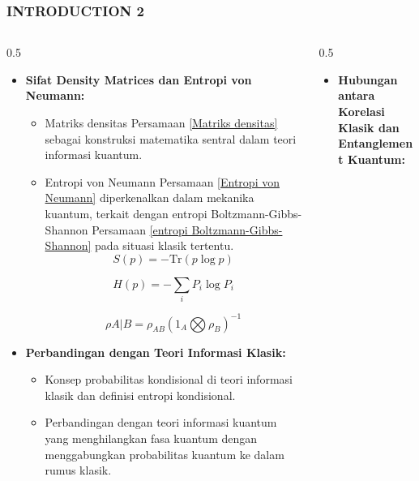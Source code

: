 \begin{frame}
    \frametitle{INTRODUCTION 2}
       \vspace*{-0.5cm}
  \begin{columns}[T]
  \small
    \begin{column}{0.5\textwidth}
        \begin{itemize}\tiny \justifying
            \item \textbf{Sifat Density Matrices dan Entropi von Neumann:}
            \begin{itemize}\tiny \justifying
            \item Matriks densitas Persamaan \ref{Matriks densitas} sebagai konstruksi matematika sentral dalam teori informasi kuantum.
            \item Entropi von Neumann Persamaan \ref{Entropi von Neumann} diperkenalkan dalam mekanika kuantum, terkait dengan entropi Boltzmann-Gibbs-Shannon Persamaan \ref{entropi Boltzmann-Gibbs-Shannon} pada situasi klasik tertentu.
                \begin{equation}
                    S(p) = -\text{Tr}(p \log p)
                    \label{Entropi von Neumann}
                \end{equation}

                \begin{equation}
                    H(p) = -\sum_i P_i \log P_i
                    \label{entropi Boltzmann-Gibbs-Shannon}
                \end{equation}
                
                \begin{equation}
                   \rho{A|B}=\rho_{AB}(1_A\bigotimes\rho_B)^{-1}
                    \label{}
                \end{equation}
            \end{itemize}
            
            \item \textbf{Perbandingan dengan Teori Informasi Klasik:}
            \begin{itemize}\tiny \justifying
            \item Konsep probabilitas kondisional di teori informasi klasik dan definisi entropi kondisional.
            \item Perbandingan dengan teori informasi kuantum yang menghilangkan fasa kuantum dengan menggabungkan probabilitas kuantum ke dalam rumus klasik.
            \end{itemize}

        \end{itemize}
    \end{column}

   \begin{column}{0.5\textwidth}
        \begin{itemize}\tiny \justifying
            \item \textbf{Hubungan antara Korelasi Klasik dan Entanglement Kuantum:}

            
        \end{itemize}
    \end{column}
  \end{columns}   
\end{frame}
